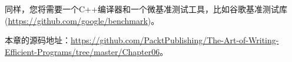 同样，您将需要一个C++编译器和一个微基准测试工具，比如谷歌基准测试库(\url{https://github.com/google/benchmark})。

本章的源码地址：\url{https://github.com/PacktPublishing/The-Art-of-Writing-Efficient-Programs/tree/master/Chapter06}。